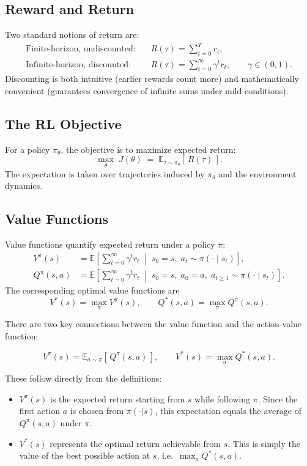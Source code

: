 \subsection{Reward and Return}
Two standard notions of return are:
\begin{align}
\text{Finite-horizon, undiscounted:}\quad & R(\tau)=\sum_{t=0}^{T} r_t, \\
\text{Infinite-horizon, discounted:}\quad & R(\tau)=\sum_{t=0}^{\infty} \gamma^{t} r_t,\qquad \gamma\in(0,1).
\end{align}
Discounting is both intuitive (earlier rewards count more) and mathematically convenient (guarantees convergence of infinite sums under mild conditions). \cite{spinningup_rl_intro}

\subsection{The RL Objective}
For a policy $\pi_\theta$, the objective is to maximize expected return:
\[
\max_{\theta}\; J(\theta) \;=\; \mathbb{E}_{\tau\sim\pi_\theta}\!\left[\,R(\tau)\,\right].
\]
The expectation is taken over trajectories induced by $\pi_\theta$ and the environment dynamics. \cite{spinningup_rl_intro}

\subsection{Value Functions}
Value functions quantify expected return under a policy $\pi$:
\begin{align}
V^{\pi}(s) &= \mathbb{E}\!\left[ \sum_{t=0}^{\infty}\gamma^t r_t \;\middle|\; s_0=s,\; a_t\sim \pi(\cdot\mid s_t) \right], \\
Q^{\pi}(s,a) &= \mathbb{E}\!\left[ \sum_{t=0}^{\infty}\gamma^t r_t \;\middle|\; s_0=s,\; a_0=a,\; a_{t\ge1}\sim \pi(\cdot\mid s_t) \right].
\end{align}
The corresponding optimal value functions are
\[
V^{*}(s)=\max_{\pi} V^{\pi}(s),\qquad Q^{*}(s,a)=\max_{\pi} Q^{\pi}(s,a).
\]
\cite{spinningup_rl_intro}

There are two key connections between the value function and the action-value function:

\[
V^\pi(s) = \mathbb{E}_{a \sim \pi}[\,Q^\pi(s,a)\,], 
\qquad
V^*(s) = \max_{a} Q^*(s,a).
\]

These follow directly from the definitions:
\begin{itemize}
    \item $V^\pi(s)$ is the expected return starting from $s$ while following $\pi$. Since the first action $a$ is chosen from $\pi(\cdot|s)$, this expectation equals the average of $Q^\pi(s,a)$ under $\pi$.
    \item $V^*(s)$ represents the optimal return achievable from $s$. This is simply the value of the best possible action at $s$, i.e.\ $\max_a Q^*(s,a)$.
\end{itemize}

